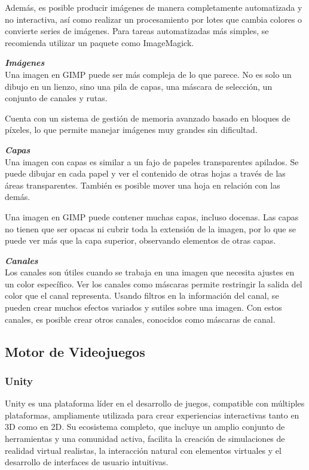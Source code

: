 Además, es posible producir imágenes de manera completamente automatizada y no interactiva, así como realizar un procesamiento por lotes que cambia colores o convierte series de imágenes. Para tareas automatizadas más simples, se recomienda utilizar un paquete como ImageMagick.

\textit{\textbf{Imágenes}}\\
Una imagen en GIMP puede ser más compleja de lo que parece. No es solo un dibujo en un lienzo, sino una pila de capas, una máscara de selección, un conjunto de canales y rutas.

Cuenta con un sistema de gestión de memoria avanzado basado en bloques de píxeles, lo que permite manejar imágenes muy grandes sin dificultad.

\textit{\textbf{Capas}}\\
Una imagen con capas es similar a un fajo de papeles transparentes apilados. Se puede dibujar en cada papel y ver el contenido de otras hojas a través de las áreas transparentes. También es posible mover una hoja en relación con las demás.

Una imagen en GIMP puede contener muchas capas, incluso docenas. Las capas no tienen que ser opacas ni cubrir toda la extensión de la imagen, por lo que se puede ver más que la capa superior, observando elementos de otras capas.

\textit{\textbf{Canales}}\\
Los canales son útiles cuando se trabaja en una imagen que necesita ajustes en un color específico. Ver los canales como máscaras permite restringir la salida del color que el canal representa. Usando filtros en la información del canal, se pueden crear muchos efectos variados y sutiles sobre una imagen. Con estos canales, es posible crear otros canales, conocidos como máscaras de canal.
\subsection{Motor de Videojuegos}
\subsubsection{Unity}
Unity es una plataforma líder en el desarrollo de juegos, compatible con múltiples plataformas, ampliamente utilizada para crear experiencias interactivas tanto en 3D como en 2D. Su ecosistema completo, que incluye un amplio conjunto de herramientas y una comunidad activa, facilita la creación de simulaciones de realidad virtual realistas, la interacción natural con elementos virtuales y el desarrollo de interfaces de usuario intuitivas.

